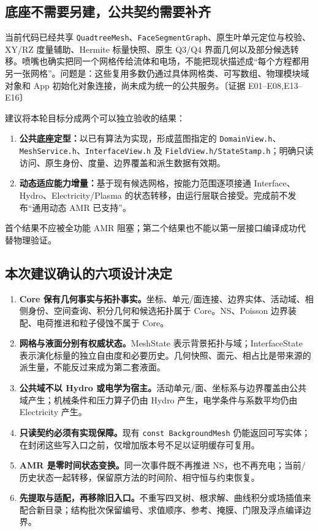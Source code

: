 \documentclass[UTF8,a4paper,11pt,fontset=fandol]{ctexart}
\newcommand{\code}[1]{\nolinkurl{#1}}
\newcommand{\ev}[1]{{\small\color{muted}〔证据 #1〕}}
\begin{document}
\subsection{底座不需要另建，公共契约需要补齐}
当前代码已经共享 \code{QuadtreeMesh}、\code{FaceSegmentGraph}、原生叶单元定位与校验、XY/RZ 度量辅助、Hermite 标量快照、原生 Q3/Q4 界面几何以及部分候选转移。喷嘴也确实把同一个网格传给流体和电场，不能把现状描述成“每个方程都用另一张网格”。问题是：这些复用多数仍通过具体网格类、可写数组、物理模块域对象和 App 初始化对象连接，尚未成为统一的公共服务。\ev{E01--E08,E13--E16}

建议将本轮目标分成两个可以独立验收的结果：
\begin{enumerate}
\item \textbf{公共底座定型：}以已有算法为实现，形成蓝图指定的 \code{DomainView.h}、\code{MeshService.h}、\code{InterfaceView.h} 及 \code{FieldView.h/StateStamp.h}；明确只读访问、原生身份、度量、边界覆盖和派生数据有效期。
\item \textbf{动态适应能力增量：}基于现有候选网格，按能力范围逐项接通 Interface、Hydro、Electricity/Plasma 的状态转移，由运行层联合接受。完成前不发布“通用动态 AMR 已支持”。
\end{enumerate}
首个结果不应被全功能 AMR 阻塞；第二个结果也不能以第一层接口编译成功代替物理验证。

\subsection{本次建议确认的六项设计决定}
\begin{enumerate}
\item \textbf{Core 保有几何事实与拓扑事实。}坐标、单元/面连接、边界实体、活动域、相侧身份、空间查询、积分几何和候选拓扑属于 Core。NS、Poisson 边界装配、电荷推进和粒子侵蚀不属于 Core。
\item \textbf{网格与液面分别有权威状态。}MeshState 表示背景拓扑与域；InterfaceState 表示演化标量的独立自由度和必要历史。几何快照、面元、相占比是带来源的派生量，不能反过来成为第二套液面。
\item \textbf{公共域不以 Hydro 或电学为宿主。}活动单元/面、坐标系与边界覆盖由公共域产生；机械条件和压力算子仍由 Hydro 产生，电学条件与系数平均仍由 Electricity 产生。
\item \textbf{只读契约必须有实现保障。}现有 \code{const BackgroundMesh} 仍能返回可写实体；在封闭这些写入口之前，仅增加版本号不足以证明缓存可复用。
\item \textbf{AMR 是零时间状态变换。}同一次事件既不再推进 NS，也不再充电；当前/历史状态一起转移，保留原方法的时间阶、相守恒与约束恢复。
\item \textbf{先提取与适配，再移除旧入口。}不重写四叉树、根求解、曲线积分或场插值来配合新目录；结构批次保留编号、求值顺序、参考、掩膜、门限及浮点编译边界。
\end{enumerate}
\end{document}
